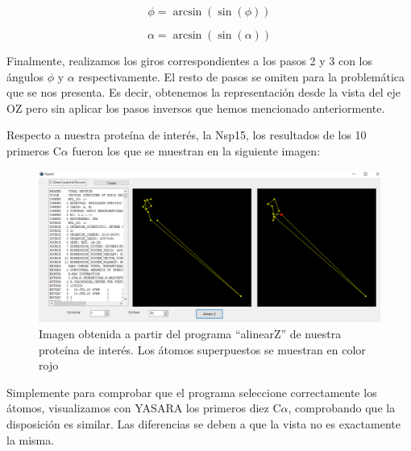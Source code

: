\documentclass[12pt]{article}
\begin{document}
\begin{equation}
\phi=\arcsin(\sin(\phi))
\end{equation}

\begin{equation}
\alpha=\arcsin(\sin(\alpha))
\end{equation}

Finalmente, realizamos los giros correspondientes a los pasos 2 y 3 con los ángulos $\phi$ y $\alpha$ respectivamente. El resto de pasos se omiten para la problemática que se nos presenta. Es decir, obtenemos la representación desde la vista del eje OZ pero sin aplicar los pasos inversos que hemos mencionado anteriormente.
\newline

Respecto a nuestra proteína de interés, la Nsp15, los resultados de los 10 primeros C$\alpha$ fueron los que se muestran en la siguiente imagen:

\begin{figure}[H]
\centering
\includegraphics[scale=0.5]{Screenshot_36}
\caption{Imagen obtenida a partir del programa ``alinearZ'' de nuestra proteína de interés. Los átomos superpuestos se muestran en color rojo}
\end{figure}

Simplemente para comprobar que el programa seleccione correctamente los átomos, visualizamos con YASARA los primeros diez C$\alpha$, comprobando que la disposición es similar. Las diferencias se deben a que la vista no es exactamente la misma.
\end{document}
